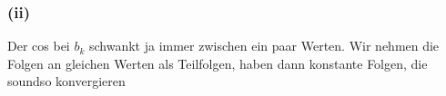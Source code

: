 \documentclass[10pt,a4paper]{scrartcl}
\begin{document}
\subsubsection*{\textbf{(ii)}}
Der cos bei $b_k$ schwankt ja immer zwischen ein paar Werten. Wir nehmen die Folgen an gleichen Werten als Teilfolgen, haben dann konstante Folgen, die soundso konvergieren
%
\end{document}

